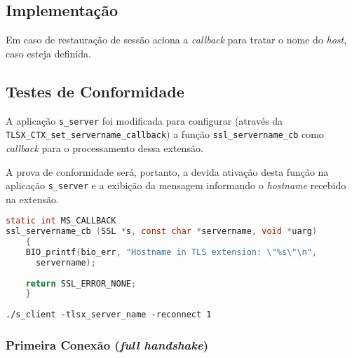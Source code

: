 \subsection{Implementação}

\begin{description}[\breaklabel\setlabelstyle{\ttfamily}]

\item[s3\_srvr.c::ssl3\_get\_client\_hello]
	Em caso de restauração de sessão aciona a \emph{callback} para tratar o nome do 
	\emph{host}, caso esteja definida.

\end{description}

\subsection{Testes de Conformidade}
A aplicação \verb|s_server| foi modificada para configurar (através da 
\verb|TLSX_CTX_set_servername_callback|) a função \verb|ssl_servername_cb| como \emph{callback}
para o processamento dessa extensão.

A prova de conformidade será, portanto, a devida ativação desta função na aplicação \verb|s_server|
e a exibição da mensagem informando o \emph{hostname} recebido na extensão.

\begin{lstlisting}[language=C,%
		    emph={ssl_servername_cb},%
		    caption=\emph{Callback} para tratar extensão \acs{SNI}]
static int MS_CALLBACK 
ssl_servername_cb (SSL *s, const char *servername, void *uarg) 
	{ 
	BIO_printf(bio_err, "Hostname in TLS extension: \"%s\"\n", 
	  servername); 
 
	return SSL_ERROR_NONE; 
	}
\end{lstlisting}

\begin{lstlisting}[caption=Chamada do script de teste para a extensão \acs{SNI}]
./s_client -tlsx_server_name -reconnect 1
\end{lstlisting}

\newpage

\subsubsection{Primeira Conexão (\emph{full handshake})}

